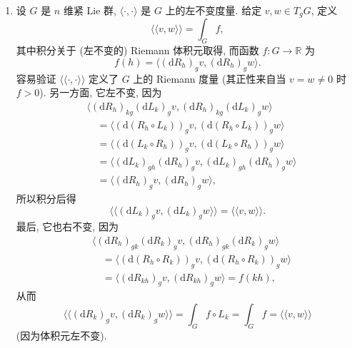 \begin{description}[font=\normalfont,leftmargin=2em,labelwidth=1.5em]
\begin{enumerate}[label=(\alph*),ref=\alph*,leftmargin=*]
\[\]
\item 设 $G$ 是 $n$ 维紧 Lie 群, $\langle\cdot,\cdot\rangle$ 是 $G$ 上的左不变度量. 给定 $v,w\in T_gG$, 定义
\[
  \langle\langle v,w\rangle\rangle=\int_G f,
\]
其中积分关于 (左不变的) Riemann 体积元取得, 而函数 $f:G\to\mathbb{R}$ 为
\[
  f(h)=\langle(\mathrm{d}R_h)_gv,(\mathrm{d}R_h)_gw\rangle.
\]
容易验证 $\langle\langle\cdot,\cdot\rangle\rangle$ 定义了 $G$ 上的 Riemann 度量 (其正性来自当 $v=w\ne0$ 时 $f>0$). 另一方面, 它左不变, 因为
\begin{align*}
  &\langle(\mathrm{d}R_h)_{kg}(\mathrm{d}L_k)_gv,(\mathrm{d}R_h)_{kg}(\mathrm{d}L_k)_gw\rangle\\
  &\quad=\langle(\mathrm{d}(R_h\circ L_k))_gv,(\mathrm{d}(R_h\circ L_k))_gw\rangle\\
  &\quad=\langle(\mathrm{d}(L_k\circ R_h))_gv,(\mathrm{d}(L_k\circ R_h))_gw\rangle\\
  &\quad=\langle(\mathrm{d}L_k)_{gh}(\mathrm{d}R_h)_gv,(\mathrm{d}L_k)_{gh}(\mathrm{d}R_h)_gw\rangle\\
  &\quad=\langle(\mathrm{d}R_h)_gv,(\mathrm{d}R_h)_gw\rangle,
\end{align*}
所以积分后得
\[
  \langle\langle(\mathrm{d}L_k)_gv,(\mathrm{d}L_k)_gw\rangle\rangle=\langle\langle v,w\rangle\rangle.
\]
最后, 它也右不变, 因为
\begin{align*}
  &\langle(\mathrm{d}R_h)_{gk}(\mathrm{d}R_k)_gv,(\mathrm{d}R_h)_{gk}(\mathrm{d}R_k)_gw\rangle\\
  &\quad=\langle(\mathrm{d}(R_h\circ R_k))_gv,(\mathrm{d}(R_h\circ R_k))_gw\rangle\\
  &\quad=\langle(\mathrm{d}R_{kh})_gv,(\mathrm{d}R_{kh})_gw\rangle=f(kh),
\end{align*}
从而
\[
  \langle\langle(\mathrm{d}R_k)_gv,(\mathrm{d}R_k)_gw\rangle\rangle
  =\int_G f\circ L_k=\int_G f=\langle\langle v,w\rangle\rangle
\]
(因为体积元左不变).
\end{enumerate}


\end{description}
